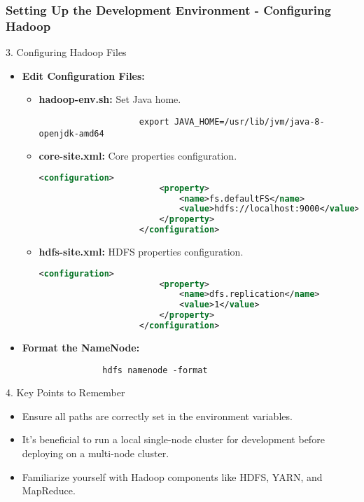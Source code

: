 \documentclass[aspectratio=169]{beamer}
\begin{document}
\begin{frame}[fragile]
    \frametitle{Setting Up the Development Environment - Configuring Hadoop}
    \begin{block}{3. Configuring Hadoop Files}
        \begin{itemize}
            \item \textbf{Edit Configuration Files:}
                \begin{itemize}
                    \item \textbf{hadoop-env.sh:} Set Java home.
                    \begin{lstlisting}
                    export JAVA_HOME=/usr/lib/jvm/java-8-openjdk-amd64
                    \end{lstlisting}
                    \item \textbf{core-site.xml:} Core properties configuration.
                    \begin{lstlisting}[language=xml]
                    <configuration>
                        <property>
                            <name>fs.defaultFS</name>
                            <value>hdfs://localhost:9000</value>
                        </property>
                    </configuration>
                    \end{lstlisting}
                    \item \textbf{hdfs-site.xml:} HDFS properties configuration.
                    \begin{lstlisting}[language=xml]
                    <configuration>
                        <property>
                            <name>dfs.replication</name>
                            <value>1</value>
                        </property>
                    </configuration>
                    \end{lstlisting}
                \end{itemize}
            \item \textbf{Format the NameNode:}
                \begin{lstlisting}
                hdfs namenode -format
                \end{lstlisting}
        \end{itemize}
    \end{block}

    \begin{block}{4. Key Points to Remember}
        \begin{itemize}
            \item Ensure all paths are correctly set in the environment variables.
            \item It’s beneficial to run a local single-node cluster for development before deploying on a multi-node cluster.
            \item Familiarize yourself with Hadoop components like HDFS, YARN, and MapReduce.
        \end{itemize}
    \end{block}


\end{frame}
\end{document}
